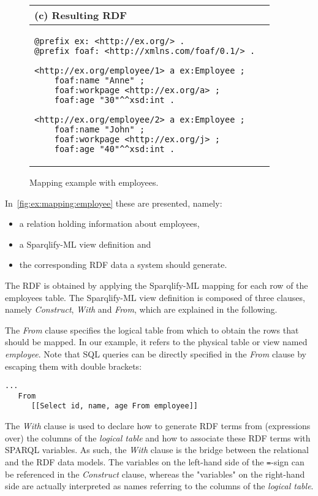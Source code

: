 \documentclass[a4paper,twoside,bibtotoc,abstracton,12pt,BCOR=15mm]{scrreprt}
\begin{document}
\begin{figure}[!p]
\begin{tabular}{p{6.5cm}p{8.5cm}}
\\

\multicolumn{2}{l}{(c) Resulting RDF} \\ \midrule
\begin{minipage}{\textwidth}
\begin{lstlisting}
@prefix ex: <http://ex.org/> .
@prefix foaf: <http://xmlns.com/foaf/0.1/> .

<http://ex.org/employee/1> a ex:Employee ;
    foaf:name "Anne" ;
    foaf:workpage <http://ex.org/a> ;
    foaf:age "30"^^xsd:int .

<http://ex.org/employee/2> a ex:Employee ;
    foaf:name "John" ;
    foaf:workpage <http://ex.org/j> ;
    foaf:age "40"^^xsd:int .

\end{lstlisting}
\end{minipage}


\\
\bottomrule
\end{tabular}
\caption{Mapping example with employees.}
\label{fig:ex:mapping:employee}
\end{figure}
In~\autoref{fig:ex:mapping:employee} these are presented, namely:
\begin{itemize} 
\item a relation holding information about employees,
\item a Sparqlify-ML view definition and 
\item the corresponding RDF data a system should generate.
\end{itemize}
The RDF is obtained by applying the Sparqlify-ML mapping for each row of the employees table.
The Sparqlify-ML view definition is composed of three clauses, namely \emph{Construct}, \emph{With} and \emph{From},
which are explained in the following.

The \emph{From} clause specifies the logical table from which to obtain the rows that should be mapped.
In our example, it refers to the physical table or view named \emph{employee}.
Note that SQL queries can be directly
specified in the \emph{From} clause by escaping them with double brackets:
\begin{lstlisting}
...
   From
      [[Select id, name, age From employee]]
\end{lstlisting}

The \emph{With} clause is used to declare how to generate RDF terms from (expressions over) the columns of the \emph{logical table} and
how to associate these RDF terms with SPARQL variables.
As such, the \emph{With} clause is the bridge between the relational and the RDF data models.
The variables on the left-hand side of the \texttt{=}-sign can be referenced in the \emph{Construct} clause, whereas
the "variables" on the right-hand side are actually interpreted as names referring to the columns of the \emph{logical table}.
\end{document}

